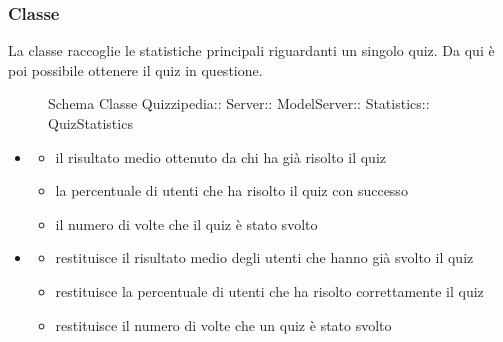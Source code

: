 \subsubsection{Classe }
La classe raccoglie le statistiche principali riguardanti un singolo quiz. Da qui è poi possibile ottenere il quiz in questione.
\begin{figure}[H]
\centering
\noindent{}
\caption[Schema Classe QuizStatistics]{Schema Classe Quizzipedia:: Server:: ModelServer:: Statistics:: QuizStatistics}
\end{figure}
\begin{itemize}
\item {}
\begin{itemize}
\item {}
\newline
il risultato medio ottenuto da chi ha già risolto il quiz
\item {}
\newline
la percentuale di utenti che ha risolto il quiz con successo
\item {}
\newline
il numero di volte che il quiz è stato svolto
\end{itemize}
\item {}
\begin{itemize}
\item {}
\newline
restituisce il risultato medio degli utenti che hanno già svolto il quiz
\newline
\item {}
\newline
restituisce la percentuale di utenti che ha risolto correttamente il quiz
\newline
\item {}
\newline
restituisce il numero di volte che un quiz è stato svolto
\newline
\end{itemize}
\end{itemize}
